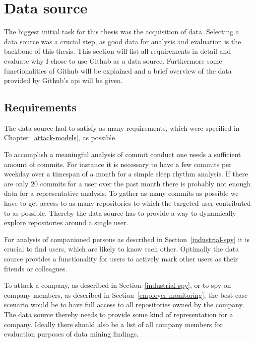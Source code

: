 \section{Data source}\label{data-source}
The biggest initial task for this thesis was the acquisition of data.
Selecting a data source was a crucial step, as good data for analysis and evaluation is the backbone of this thesis.
This section will list all requirements in detail and evaluate why I chose to use Github as a data source.
Furthermore some functionalities of Github will be explained and a brief overview of the data provided by Github's \ac{api} will be given.


\subsection{Requirements}\label{requirements}
The data source had to satisfy as many requirements, which were specified in Chapter~\ref{attack-models}, as possible.

To accomplish a meaningful analysis of commit conduct one needs a sufficient amount of commits.
For instance it is necessary to have a few commits per weekday over a timespan of a month for a simple sleep rhythm analysis.
If there are only 20 commits for a user over the past month there is probably not enough data for a representative analysis.
To gather as many commits as possible we have to get access to as many repositories to which the targeted user contributed to as possible.
Thereby the data source has to provide a way to dynamically explore repositories around a single user.

For analysis of companioned persons as described in Section~\ref{industrial-spy} it is crucial to find users, which are likely to know each other.
Optimally the data source provides a functionality for users to actively mark other users as their friends or colleagues.

To attack a company, as described in Section~\ref{industrial-spy}, or to spy on company members, as described in Section~\ref{employer-monitoring}, the best case scenario would be to have full access to all repositories owned by the company.
The data source thereby needs to provide some kind of representation for a company.
Ideally there should also be a list of all company members for evaluation purposes of data mining findings.



